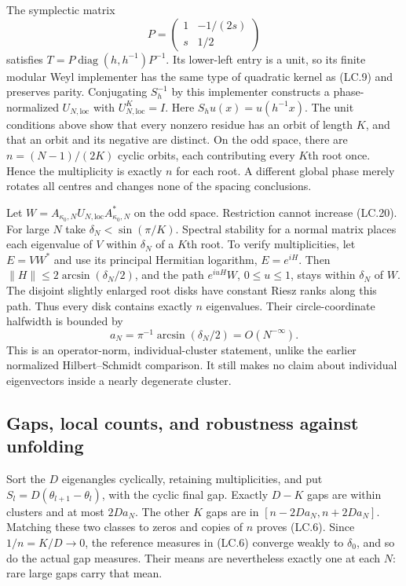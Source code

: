 The symplectic matrix \[
 P=\begin{pmatrix}1&-1/(2s)\\s&1/2\end{pmatrix}
\] satisfies \(T=P\operatorname{diag}(h,h^{-1})P^{-1}\). Its lower-left entry is a unit, so its finite modular Weyl implementer has the same type of quadratic kernel as (LC.9) and preserves parity. Conjugating \(S_h^{-1}\) by this implementer constructs a phase-normalized \(U_{N,\mathrm{loc}}\) with \(U_{N,\mathrm{loc}}^K=I\). Here \(S_hu(x)=u(h^{-1}x)\). The unit conditions above show that every nonzero residue has an orbit of length \(K\), and that an orbit and its negative are distinct. On the odd space, there are \(n=(N-1)/(2K)\) cyclic orbits, each contributing every \(K\)th root once. Hence the multiplicity is exactly \(n\) for each root. A different global phase merely rotates all centres and changes none of the spacing conclusions.

Let \(W=A_{{\kappa_0},N}U_{N,\mathrm{loc}}A_{{\kappa_0},N}^*\) on the odd space. Restriction cannot increase (LC.20). For large \(N\) take \(\delta_N<\sin(\pi/K)\). Spectral stability for a normal matrix places each eigenvalue of \(V\) within \(\delta_N\) of a \(K\)th root. To verify multiplicities, let \(E=VW^*\) and use its principal Hermitian logarithm, \(E=e^{iH}\). Then \(\|H\|\leq2\arcsin(\delta_N/2)\), and the path \(e^{iuH}W\), \(0\leq u\leq1\), stays within \(\delta_N\) of \(W\). The disjoint slightly enlarged root disks have constant Riesz ranks along this path. Thus every disk contains exactly \(n\) eigenvalues. Their circle-coordinate halfwidth is bounded by \[
 a_N=\pi^{-1}\arcsin(\delta_N/2)=O(N^{-\infty}).              \tag{LC.22}
\] This is an operator-norm, individual-cluster statement, unlike the earlier normalized Hilbert--Schmidt comparison. It still makes no claim about individual eigenvectors inside a nearly degenerate cluster.

\subsection{Gaps, local counts, and robustness against unfolding}\label{locality:gaps-local-counts-and-robustness-against-unfolding}

Sort the \(D\) eigenangles cyclically, retaining multiplicities, and put \(S_l=D(\theta_{l+1}-\theta_l)\), with the cyclic final gap. Exactly \(D-K\) gaps are within clusters and at most \(2Da_N\). The other \(K\) gaps are in \([n-2Da_N,n+2Da_N]\). Matching these two classes to zeros and copies of \(n\) proves (LC.6). Since \(1/n=K/D\to0\), the reference measures in (LC.6) converge weakly to \(\delta_0\), and so do the actual gap measures. Their means are nevertheless exactly one at each \(N\): rare large gaps carry that mean.

